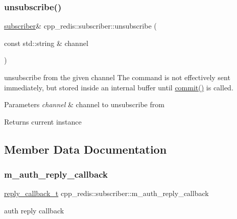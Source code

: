 \subsubsection{\texorpdfstring{unsubscribe()}{unsubscribe()}}
{\footnotesize\ttfamily \hyperlink{classcpp__redis_1_1subscriber}{subscriber}\& cpp\+\_\+redis\+::subscriber\+::unsubscribe (\begin{DoxyParamCaption}\item[{const std\+::string \&}]{channel }\end{DoxyParamCaption})}

unsubscribe from the given channel The command is not effectively sent immediately, but stored inside an internal buffer until \hyperlink{classcpp__redis_1_1subscriber_abbf600802ed93b82323185eec5719ecb}{commit()} is called.


\begin{DoxyParams}{Parameters}
{\em channel} & channel to unsubscribe from \\
\hline
\end{DoxyParams}
\begin{DoxyReturn}{Returns}
current instance 
\end{DoxyReturn}


\subsection{Member Data Documentation}
\mbox{\label{classcpp__redis_1_1subscriber_a045f1c4e84a7384565deb2d8e7023dfd}} 
\subsubsection{\texorpdfstring{m\+\_\+auth\+\_\+reply\+\_\+callback}{m\_auth\_reply\_callback}}
{\footnotesize\ttfamily \hyperlink{classcpp__redis_1_1subscriber_a99d220cc662664e2399b709f61ac9581}{reply\+\_\+callback\+\_\+t} cpp\+\_\+redis\+::subscriber\+::m\+\_\+auth\+\_\+reply\+\_\+callback\hspace{0.3cm}{\ttfamily [private]}}

auth reply callback \mbox{\label{classcpp__redis_1_1subscriber_a66dd15a4eb08cf3ed7e926a83b10cc9f}} 
